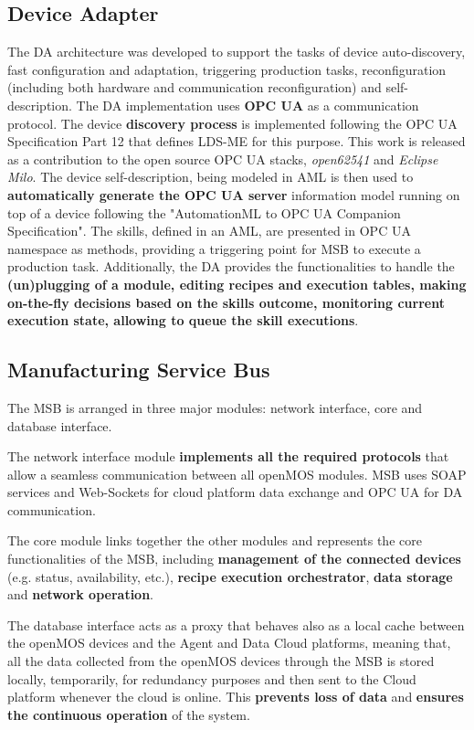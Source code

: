 \subsection{Device Adapter}
The \gls{DA} architecture was developed to support the tasks of device auto-discovery, fast configuration and adaptation, triggering production tasks, reconfiguration (including both hardware and communication reconfiguration) and self-description.
The \gls{DA} implementation uses \textbf{\gls{OPC UA}} as a communication protocol.
The device \textbf{discovery process} is implemented following the \gls{OPC UA} Specification Part 12 that defines \gls{LDS-ME} for this purpose.
This work is released as a contribution to the open source \gls{OPC UA} stacks, \emph{open62541} and \emph{Eclipse Milo}.
The device self-description, being modeled in \gls{AML} is then used to \textbf{automatically generate the \gls{OPC UA} server} information model running on top of a device following the "AutomationML to OPC UA Companion Specification".
The skills, defined in an \gls{AML}, are presented in \gls{OPC UA} namespace as methods, providing a triggering point for \gls{MSB} to execute a production task.
Additionally, the \gls{DA} provides the functionalities to handle the \textbf{(un)plugging of a module, editing recipes and execution tables, making on-the-fly decisions based on the skills outcome, monitoring current execution state, allowing to queue the skill executions}.

\subsection{Manufacturing Service Bus}
The \gls{MSB} is arranged in three major modules: network interface, core and database interface.

The network interface module \textbf{implements all the required protocols} that allow a seamless communication between all \gls{openMOS} modules. 
\gls{MSB} uses \gls{SOAP} services and Web-Sockets for cloud platform data exchange and \gls{OPC UA} for DA communication.

The core module  links together the other modules and represents the core functionalities of the \gls{MSB}, including \textbf{management of the connected devices} (e.g. status, availability, etc.), \textbf{recipe execution orchestrator}, \textbf{data storage} and \textbf{network operation}.

The database interface acts as a proxy that behaves also as a local cache between the openMOS devices and the Agent and Data Cloud platforms, meaning that, all the data collected from the openMOS devices through the MSB is stored locally, temporarily, for redundancy purposes and then sent to the Cloud platform whenever the cloud is online. 
This \textbf{prevents loss of data} and \textbf{ensures the continuous operation} of the system.

